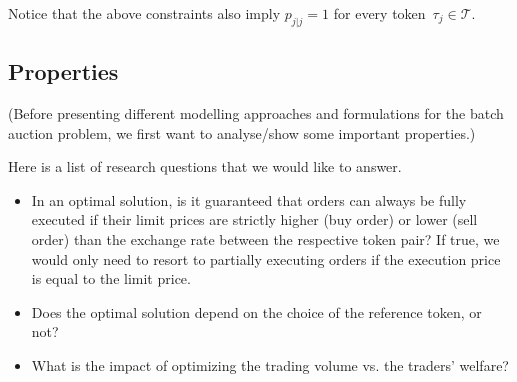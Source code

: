 \documentclass[11pt,parskip=full]{scrartcl}%
\newcommand*{\tokens}{\mathcal{T}}          %
\newtheorem{lemma}[theorem]{Lemma}
\begin{document}
Notice that the above constraints also imply $ p_{j|j} = 1 $ for every
token~$ \tau_j \in \tokens $.

\subsection{Properties}
\label{subsec:properties}

(Before presenting different modelling approaches and formulations for the batch auction problem,
we first want to analyse/show some important properties.)

Here is a list of research questions that we would like to answer.

\begin{itemize}
  \item In an optimal solution, is it guaranteed that orders can always be fully executed if their
  limit prices are strictly higher (buy order) or lower (sell order) than the exchange rate between
  the respective token pair?
  If true, we would only need to resort to partially executing orders if the execution price is
  equal to the limit price.
  \item Does the optimal solution depend on the choice of the reference token, or not?
  \item What is the impact of optimizing the trading volume vs. the traders' welfare?
\end{itemize}

\vspace{1cm}
\end{document}
